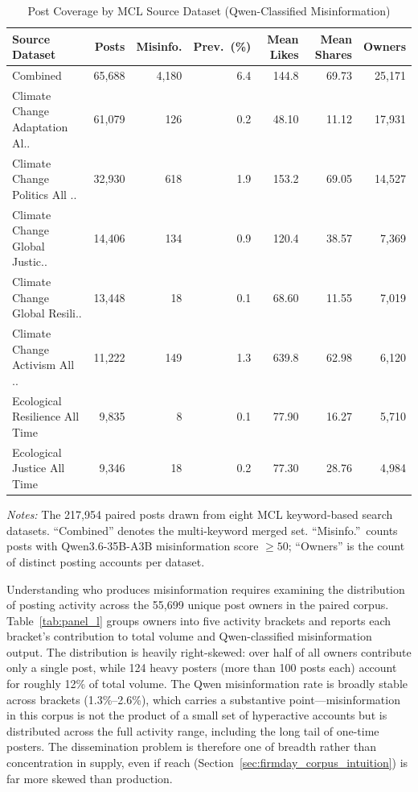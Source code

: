 \documentclass{article}
\theoremstyle{plain}
\begin{document}
\begin{table}[!ht]
\centering
\caption{Post Coverage by MCL Source Dataset (Qwen-Classified Misinformation)}
\label{tab:panel_k}
\begin{threeparttable}
\begin{tabularx}{\textwidth}{l R R R R R R}
\toprule
Source Dataset & Posts & Misinfo. & Prev.\ (\%) & Mean Likes & Mean Shares & Owners \\
\midrule
Combined & 65,688 & 4,180 & 6.4 & 144.8 & 69.73 & 25,171 \\
Climate Change Adaptation Al.. & 61,079 & 126 & 0.2 & 48.10 & 11.12 & 17,931 \\
Climate Change Politics All .. & 32,930 & 618 & 1.9 & 153.2 & 69.05 & 14,527 \\
Climate Change Global Justic.. & 14,406 & 134 & 0.9 & 120.4 & 38.57 & 7,369 \\
Climate Change Global Resili.. & 13,448 & 18 & 0.1 & 68.60 & 11.55 & 7,019 \\
Climate Change Activism All .. & 11,222 & 149 & 1.3 & 639.8 & 62.98 & 6,120 \\
Ecological Resilience All Time & 9,835 & 8 & 0.1 & 77.90 & 16.27 & 5,710 \\
Ecological Justice All Time & 9,346 & 18 & 0.2 & 77.30 & 28.76 & 4,984 \\
\bottomrule
\end{tabularx}
\begin{tablenotes}\small
\item \textit{Notes:} The 217,954 paired posts drawn from eight MCL keyword-based search datasets. ``Combined'' denotes the multi-keyword merged set. ``Misinfo.''\ counts posts with Qwen3.6-35B-A3B misinformation score $\geq 50$; ``Owners'' is the count of distinct posting accounts per dataset.
\end{tablenotes}
\end{threeparttable}
\end{table}

Understanding who produces misinformation requires examining the distribution of posting activity across the 55,699 unique post owners in the paired corpus. Table~\ref{tab:panel_l} groups owners into five activity brackets and reports each bracket's contribution to total volume and Qwen-classified misinformation output. The distribution is heavily right-skewed: over half of all owners contribute only a single post, while 124 heavy posters (more than 100 posts each) account for roughly 12\% of total volume. The Qwen misinformation rate is broadly stable across brackets (1.3\%--2.6\%), which carries a substantive point---misinformation in this corpus is not the product of a small set of hyperactive accounts but is distributed across the full activity range, including the long tail of one-time posters. The dissemination problem is therefore one of breadth rather than concentration in supply, even if reach (Section~\ref{sec:firmday_corpus_intuition}) is far more skewed than production.
\end{document}
